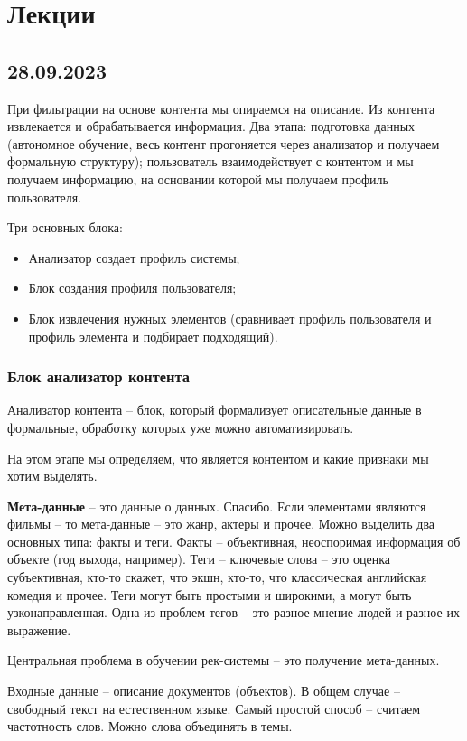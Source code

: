 \section{Лекции}

\subsection{28.09.2023}

При фильтрации на основе контента мы опираемся на описание. Из контента извлекается и обрабатывается информация.
Два этапа: подготовка данных (автономное обучение, весь контент прогоняется через анализатор и получаем формальную структуру); пользователь взаимодействует с контентом и мы получаем информацию, на основании которой мы получаем профиль пользователя.

Три основных блока:
\begin{itemize}
    \item Анализатор создает профиль системы;
    \item Блок создания профиля пользователя;
    \item Блок извлечения нужных элементов (сравнивает профиль пользователя и профиль элемента и подбирает подходящий).
\end{itemize}

\subsubsection{Блок анализатор контента}
Анализатор контента -- блок, который формализует описательные данные в формальные, обработку которых уже можно автоматизировать. 

На этом этапе мы определяем, что является контентом и какие признаки мы хотим выделять. 

\textbf{Мета-данные} -- это данные о данных. Спасибо. Если элементами являются фильмы -- то мета-данные -- это жанр, актеры и прочее. Можно выделить два основных типа: факты и теги. Факты -- объективная, неоспоримая информация об объекте (год выхода, например). Теги -- ключевые слова -- это оценка субъективная, кто-то скажет, что экшн, кто-то, что классическая английская комедия и прочее. Теги могут быть простыми и широкими, а могут быть узконаправленная. Одна из проблем тегов -- это разное мнение людей и разное их выражение.

Центральная проблема в обучении рек-системы -- это получение мета-данных.

Входные данные -- описание документов (объектов). В общем случае -- свободный текст на естественном языке. Самый простой способ -- считаем частотность слов. Можно слова объединять в темы.

